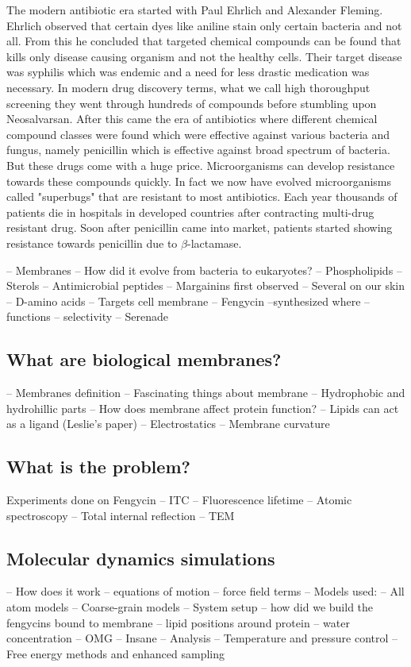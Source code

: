 The modern antibiotic era started with Paul Ehrlich and Alexander Fleming. 
Ehrlich observed that certain dyes like aniline stain only certain bacteria and not all. 
From this he concluded that targeted chemical compounds can be found that 
kills only disease causing organism and not the healthy cells. 
Their target disease was syphilis which was endemic and a need for less drastic medication
was necessary. In modern drug discovery terms, what we call high thoroughput screening 
they went through hundreds of compounds before stumbling upon 
Neosalvarsan.\cite{Hata1910}
After this came the era of antibiotics where different chemical compound classes were 
found which were effective against various bacteria and fungus, namely penicillin which is effective against broad spectrum of bacteria.\cite{Fleming1929}
But these drugs come with a huge price. Microorganisms can develop resistance towards 
these compounds quickly. In fact we now have evolved microorganisms called "superbugs" that 
are resistant to most antibiotics. Each year thousands of patients die in 
hospitals in developed countries after contracting multi-drug resistant 
drug.\cite{@roderick2007}
Soon after penicillin came into market, patients started showing resistance towards 
penicillin due to $\beta$-lactamase.



    -- Membranes 
        -- How did it evolve from bacteria to eukaryotes? 
        -- Phospholipids 
        -- Sterols 
    -- Antimicrobial peptides 
        -- Margainins first observed 
        -- Several on our skin 
        -- D-amino acids 
        -- Targets cell membrane 
    -- Fengycin
        --synthesized where 
        -- functions 
        -- selectivity 
        -- Serenade 

\subsection{What are biological membranes?}
\label{s:membrane_intro}
-- Membranes definition 
-- Fascinating things about membrane 
-- Hydrophobic and hydrohillic parts 
-- How does membrane affect protein function? 
    -- Lipids can act as a ligand (Leslie's paper) 
    -- Electrostatics 
    -- Membrane curvature 

\subsection{What is the problem?}
Experiments done on Fengycin 
-- ITC 
-- Fluorescence lifetime 
-- Atomic spectroscopy 
-- Total internal reflection 
-- TEM 


\subsection{Molecular dynamics simulations}
-- How does it work 
    -- equations of motion
    -- force field terms 
-- Models used: 
    -- All atom models 
    -- Coarse-grain models 
-- System setup 
    -- how did we build the fengycins bound to membrane 
    -- lipid positions around protein 
    -- water concentration 
    -- OMG 
    -- Insane 
-- Analysis 
-- Temperature and pressure control 
-- Free energy methods and enhanced sampling 
